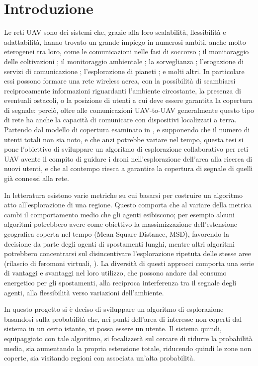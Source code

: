 \section*{Introduzione} \label{sec:intro}

Le reti UAV sono dei sistemi che, grazie alla loro scalabilità, flessibilità e adattabilità, hanno trovato un grande impiego in numerosi ambiti, anche molto eterogenei tra loro, come le comunicazioni nelle fasi di soccorso \cite{GuanYue2024CUTD}; il monitoraggio delle coltivazioni \cite{farming}; il monitoraggio ambientale \cite{forest}; la sorveglianza \cite{JainRachna2021TaSS}; l'erogazione di servizi di comunicazione \cite{8675384}; l'esplorazione di pianeti \cite{planetaryExpl}; e molti altri.
In particolare essi possono formare una rete wireless aerea, con la possibilità di scambiarsi reciprocamente informazioni riguardanti l'ambiente circostante, la presenza di eventuali ostacoli, o la posizione di utenti a cui deve essere garantita la copertura di segnale: perciò, oltre alle comunicazioni UAV-to-UAV generalmente questo tipo di rete ha anche la capacità di comunicare con dispositivi localizzati a terra.
\newline
\newline
Partendo dal modello di copertura esaminato in \cite{tesiInnocenti}, e supponendo che il numero di utenti totali non sia noto, e che anzi potrebbe variare nel tempo, questa tesi si pone l'obiettivo di sviluppare un algoritmo di esplorazione collaborativo per reti UAV avente il compito di guidare i droni nell'esplorazione dell'area alla ricerca di nuovi utenti, e che al contempo riesca a garantire la copertura di segnale di quelli già connessi alla rete.

In letteratura esistono varie metriche su cui basarsi per costruire un algoritmo atto all'esplorazione di una regione.
Questo comporta che al variare della metrica cambi il comportamento medio che gli agenti esibiscono; per esempio alcuni algoritmi potrebbero avere come obiettivo la massimizzazione dell'estensione geografica coperta nel tempo (Mean Square Distance, MSD), favorendo la decisione da parte degli agenti di spostamenti lunghi, mentre altri algoritmi potrebbero concentrarsi sul disincentivare l'esplorazione ripetuta delle stesse aree (rilascio di feromoni virtuali, \cite{SchroederAdam2017Escb}).
La diversità di questi approcci comporta una serie di vantaggi e svantaggi nel loro utilizzo, che possono andare dal consumo energetico per gli spostamenti, alla reciproca interferenza tra il segnale degli agenti, alla flessibilità verso variazioni dell'ambiente.

In questo progetto si è deciso di sviluppare un algoritmo di esplorazione basandosi sulla probabilità che, nei punti dell'area di interesse non coperti dal sistema in un certo istante, vi possa essere un utente. Il sistema quindi, equipaggiato con tale algoritmo, si focalizzerà sul cercare di ridurre la probabilità media, sia aumentando la propria estensione totale, riducendo quindi le zone non coperte, sia visitando regioni con associata un'alta probabilità.


